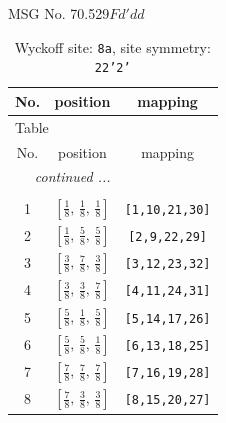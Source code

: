 \documentclass[fleqn,8pt]{jsarticle}
\begin{document}
\setcounter{MaxMatrixCols}{32}

\renewcommand{\tablename}{Table~}
\renewcommand{\figurename}{Figure~}
\begin{center}
\LARGE
MSG No. 70.529\quad$Fd'dd$
\end{center}
\renewcommand{\arraystretch}{1.2}
\begin{longtable}{ccc}
\caption{Wyckoff site: {\tt 8a}, site symmetry: {\tt 22'2'}}
 \\
 \hline \hline
No. & position & mapping \\ \hline \endfirsthead

\multicolumn{2}{l}{\tablename\ \thetable{}} \\
 \hline \hline
No. & position & mapping \\ \hline \endhead

 \hline \hline
\multicolumn{2}{r}{\footnotesize\it continued ...} \\ \endfoot

 \hline \hline
\multicolumn{2}{r}{} \\ \endlastfoot

1 & $\left[ \frac{1}{8},\, \frac{1}{8},\, \frac{1}{8} \right]$ & {\tt [1,10,21,30]} \\ \hline
2 & $\left[ \frac{1}{8},\, \frac{5}{8},\, \frac{5}{8} \right]$ & {\tt [2,9,22,29]} \\ \hline
3 & $\left[ \frac{3}{8},\, \frac{7}{8},\, \frac{3}{8} \right]$ & {\tt [3,12,23,32]} \\ \hline
4 & $\left[ \frac{3}{8},\, \frac{3}{8},\, \frac{7}{8} \right]$ & {\tt [4,11,24,31]} \\ \hline
5 & $\left[ \frac{5}{8},\, \frac{1}{8},\, \frac{5}{8} \right]$ & {\tt [5,14,17,26]} \\ \hline
6 & $\left[ \frac{5}{8},\, \frac{5}{8},\, \frac{1}{8} \right]$ & {\tt [6,13,18,25]} \\ \hline
7 & $\left[ \frac{7}{8},\, \frac{7}{8},\, \frac{7}{8} \right]$ & {\tt [7,16,19,28]} \\ \hline
8 & $\left[ \frac{7}{8},\, \frac{3}{8},\, \frac{3}{8} \right]$ & {\tt [8,15,20,27]} \\
\end{longtable}
\renewcommand{\arraystretch}{1.2}
\end{document}
